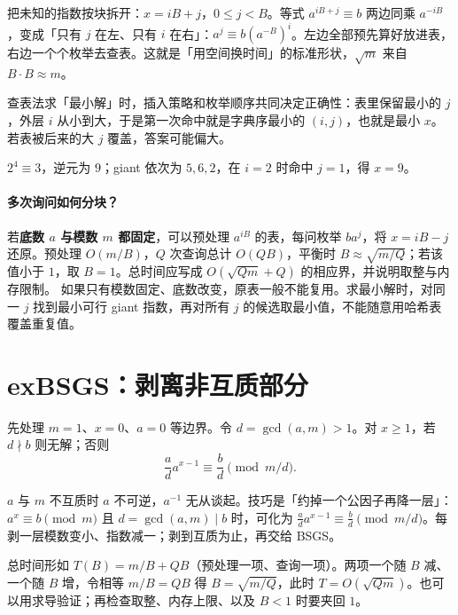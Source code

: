 \documentclass[UTF8,a4paper,11pt,twoside,openright,fontset=fandol]{ctexbook}
\theoremstyle{definition}
\begin{document}
\begin{tip}
把未知的指数按块拆开：$x=iB+j$，$0\le j<B$。等式 $a^{iB+j}\equiv b$ 两边同乘 $a^{-iB}$，变成「只有 $j$ 在左、只有 $i$ 在右」：$a^j\equiv b(a^{-B})^i$。左边全部预先算好放进表，右边一个个枚举去查表。这就是「用空间换时间」的标准形状，$\sqrt m$ 来自 $B\cdot B\approx m$。
\end{tip}

\begin{tip}
查表法求「最小解」时，插入策略和枚举顺序共同决定正确性：表里保留最小的 $j$，外层 $i$ 从小到大，于是第一次命中就是字典序最小的 $(i,j)$，也就是最小 $x$。若表被后来的大 $j$ 覆盖，答案可能偏大。
\end{tip}

$2^4\equiv3$，逆元为 $9$；giant 依次为 $5,6,2$，在 $i=2$ 时命中 $j=1$，得 $x=9$。

\paragraph{多次询问如何分块？}
若\textbf{底数 $a$ 与模数 $m$ 都固定}，可以预处理 $a^{iB}$ 的表，每问枚举 $ba^j$，将 $x=iB-j$ 还原。预处理 $O(m/B)$，$Q$ 次查询总计 $O(QB)$，平衡时 $B\approx\sqrt{m/Q}$；若该值小于 $1$，取 $B=1$。总时间应写成 $O(\sqrt{Qm}+Q)$ 的相应界，并说明取整与内存限制。
如果只有模数固定、底数改变，原表一般不能复用。求最小解时，对同一 $j$ 找到最小可行 giant 指数，再对所有 $j$ 的候选取最小值，不能随意用哈希表覆盖重复值。


\section{exBSGS：剥离非互质部分}
先处理 $m=1$、$x=0$、$a=0$ 等边界。令 $d=\gcd(a,m)>1$。对 $x\ge1$，若 $d\nmid b$ 则无解；否则
\[
 \frac ad a^{x-1}\equiv\frac bd\pmod{m/d}.
\]

\begin{tip}
$a$ 与 $m$ 不互质时 $a$ 不可逆，$a^{-1}$ 无从谈起。技巧是「约掉一个公因子再降一层」：$a^x\equiv b\pmod m$ 且 $d=\gcd(a,m)\mid b$ 时，可化为 $\frac ad a^{x-1}\equiv\frac b d\pmod{m/d}$。每剥一层模数变小、指数减一；剥到互质为止，再交给 BSGS。
\end{tip}

\begin{tip}[「平衡」两个成本的做法]
总时间形如 $T(B)=m/B+QB$（预处理一项、查询一项）。两项一个随 $B$ 减、一个随 $B$ 增，令相等 $m/B=QB$ 得 $B=\sqrt{m/Q}$，此时 $T=O(\sqrt{Qm})$。也可以用求导验证；再检查取整、内存上限、以及 $B<1$ 时要夹回 $1$。
\end{tip}
\end{document}
